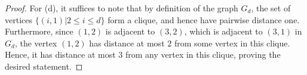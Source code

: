 \documentclass[centering,11pt,reqno]{amsart}
\newtheorem{lem}[theorem]{Lemma}
\theoremstyle{definition}
\begin{document}
\begin{proof}
For (d), it suffices to note that by definition of the graph $G_d$, the set of vertices $\{(i,1)|2\le i\le d\}$ form a clique, and hence have pairwise distance one. Furthermore, since $(1,2)$ is adjacent to $(3,2)$, which is adjacent to $(3,1)$ in $G_d$, the vertex $(1,2)$ has distance at most $2$ from some vertex in this clique. Hence, it has distance at most $3$ from any vertex in this clique, proving the desired statement.
\end{proof}


\end{document}
